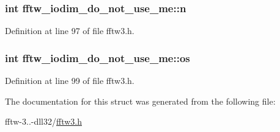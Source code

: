 \hypertarget{structfftw__iodim__do__not__use__me_aa9ceb61afc1731380bdb48305aa40ce0}{
\subsubsection[{n}]{\setlength{\rightskip}{0pt plus 5cm}int fftw\-\_\-iodim\-\_\-do\-\_\-not\-\_\-use\-\_\-me\-::n}}\label{structfftw__iodim__do__not__use__me_aa9ceb61afc1731380bdb48305aa40ce0}


Definition at line 97 of file fftw3.\-h.

\hypertarget{structfftw__iodim__do__not__use__me_acff6a6b2225f610d3bee5380e801abb4}{
\subsubsection[{os}]{\setlength{\rightskip}{0pt plus 5cm}int fftw\-\_\-iodim\-\_\-do\-\_\-not\-\_\-use\-\_\-me\-::os}}\label{structfftw__iodim__do__not__use__me_acff6a6b2225f610d3bee5380e801abb4}


Definition at line 99 of file fftw3.\-h.



The documentation for this struct was generated from the following file\-:\begin{DoxyCompactItemize}
\item 
fftw-\/3..-\/dll32/\hyperlink{fftw-3_82_82-dll32_2fftw3_8h}{fftw3.\-h}\end{DoxyCompactItemize}
